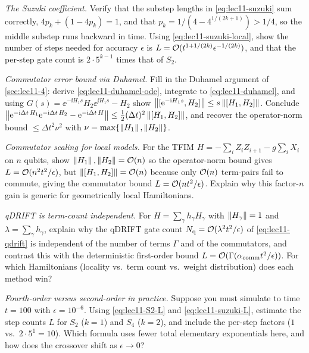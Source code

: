 \begin{exercise}\label{ex:lec11-4}
\emph{The Suzuki coefficient.} Verify that the substep lengths in
\eqref{eq:lec11-suzuki} sum correctly, $4p_k+(1-4p_k)=1$, and that $p_k=1/(4-4^{1/(2k+1)})
>1/4$, so the middle substep runs backward in time. Using
\eqref{eq:lec11-suzuki-local}, show the number of steps needed for accuracy $\epsilon$ is
$L=\mathcal{O}(t^{1+1/(2k)}\epsilon^{-1/(2k)})$, and that the per-step gate count is
$2\cdot5^{k-1}$ times that of $S_2$.
\end{exercise}

\begin{exercise}\label{ex:lec11-5}
\emph{Commutator error bound via Duhamel.} Fill in the Duhamel argument of
\cref{sec:lec11-4}: derive \eqref{eq:lec11-duhamel-ode}, integrate to
\eqref{eq:lec11-duhamel}, and using $G(s)=\ee^{-\ii H_1 s}H_2\ee^{\ii H_1 s}-H_2$ show
$\left\lVert [\mathrm{e}^{-\mathrm{i} H_1 s},H_2] \right\rVert\le s\left\lVert [H_1,H_2] \right\rVert$. Conclude
$\left\lVert \mathrm{e}^{-\mathrm{i}\Delta t\,H_1}\mathrm{e}^{-\mathrm{i}\Delta t\,H_2}-\mathrm{e}^{-\mathrm{i}\Delta t\,H} \right\rVert\le
\tfrac12(\Delta t)^2\left\lVert [H_1,H_2] \right\rVert$, and recover the operator-norm bound $\le\Delta
t^2\nu^2$ with $\nu=\max\{\left\lVert H_1 \right\rVert,\left\lVert H_2 \right\rVert\}$.
\end{exercise}

\begin{exercise}\label{ex:lec11-6}
\emph{Commutator scaling for local models.} For the TFIM
$H=-\sum_iZ_iZ_{i+1}-g\sum_iX_i$ on $n$ qubits, show $\left\lVert H_1 \right\rVert,\left\lVert H_2 \right\rVert=\mathcal{O}(n)$ so
the operator-norm bound gives $L=\mathcal{O}(n^2t^2/\epsilon)$, but $\left\lVert [H_1,H_2] \right\rVert=\mathcal{O}(n)$
because only $\mathcal{O}(n)$ term-pairs fail to commute, giving the commutator bound
$L=\mathcal{O}(nt^2/\epsilon)$. Explain why this factor-$n$ gain is generic for geometrically
local Hamiltonians.
\end{exercise}

\begin{exercise}\label{ex:lec11-7}
\emph{qDRIFT is term-count independent.} For $H=\sum_\gamma h_\gamma H_\gamma$ with
$\left\lVert H_\gamma \right\rVert=1$ and $\lambda=\sum_\gamma h_\gamma$, explain why the qDRIFT gate count
$N_{\mathrm q}=\mathcal{O}(\lambda^2t^2/\epsilon)$ of \eqref{eq:lec11-qdrift} is independent of
the number of terms $\Gamma$ and of the commutators, and contrast this with the
deterministic first-order bound $L=\mathcal{O}(\Gamma(\alpha_{\mathrm{comm}}t^2/\epsilon))$. For
which Hamiltonians (locality vs.\ term count vs.\ weight distribution) does each method
win?
\end{exercise}

\begin{exercise}\label{ex:lec11-8}
\emph{Fourth-order versus second-order in practice.} Suppose you must simulate to time
$t=100$ with $\epsilon=10^{-6}$. Using \eqref{eq:lec11-S2-L} and
\eqref{eq:lec11-suzuki-L}, estimate the step counts $L$ for $S_2$ ($k=1$) and $S_4$
($k=2$), and include the per-step factors ($1$ vs.\ $2\cdot5^{1}=10$). Which formula uses
fewer total elementary exponentials here, and how does the crossover shift as
$\epsilon\to0$?
\end{exercise}

